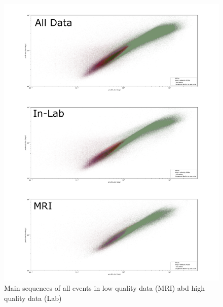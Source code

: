     \begin{figure}[h!]
        \includegraphics[width=1\textwidth]{img/overallCompar.pdf}
        \caption{Main sequences of all events in low quality data (MRI) abd high quality data (Lab)}
        \label{fig:overallComp}
    \end{figure}


